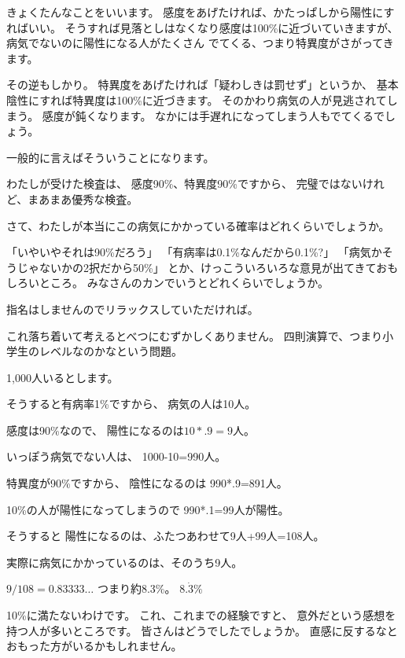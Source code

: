 \documentclass[uplatex,jis2004,dvipdfmx,12pt]{jsarticle}
\begin{document}
きょくたんなことをいいます。
感度をあげたければ、かたっぱしから陽性にすればいい。
そうすれば見落としはなくなり感度は100\%に近づいていきますが、
病気でないのに陽性になる人がたくさん
でてくる、つまり特異度がさがってきます。

その逆もしかり。
特異度をあげたければ「疑わしきは罰せず」というか、
基本陰性にすれば特異度は100\%に近づきます。
そのかわり病気の人が見逃されてしまう。
感度が鈍くなります。
なかには手遅れになってしまう人もでてくるでしょう。

一般的に言えばそういうことになります。

わたしが受けた検査は、
感度90\%、特異度90\%ですから、
完璧ではないけれど、まあまあ優秀な検査。


さて、わたしが本当にこの病気にかかっている確率はどれくらいでしょうか。

「いやいやそれは90\%だろう」
「有病率は0.1\%なんだから0.1\%?」
「病気かそうじゃないかの2択だから50\%」
とか、けっこういろいろな意見が出てきておもしろいところ。
みなさんのカンでいうとどれくらいでしょうか。

指名はしませんのでリラックスしていただければ。

これ落ち着いて考えるとべつにむずかしくありません。
四則演算で、つまり小学生のレベルなのかなという問題。


1,000人いるとします。

そうすると有病率1\%ですから、
病気の人は10人。


感度は90\%なので、
陽性になるのは$10*.9=9$人。


いっぽう病気でない人は、
1000-10=990人。

特異度が90\%ですから、
陰性になるのは
990*.9=891人。

10\%の人が陽性になってしまうので
990*.1=99人が陽性。

そうすると
陽性になるのは、ふたつあわせて9人+99人=108人。

実際に病気にかかっているのは、そのうち9人。

$9/108=0.83333\dots$
つまり約8.3\%。
$8.\dot{3}\%$

10\%に満たないわけです。
これ、これまでの経験ですと、
意外だという感想を持つ人が多いところです。
皆さんはどうでしたでしょうか。
直感に反するなとおもった方がいるかもしれません。


\bigskip
\end{document}
